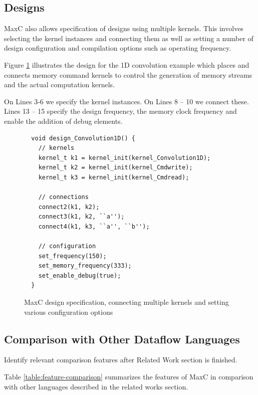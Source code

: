 \subsection{Designs}



MaxC also allows specification of designs using multiple kernels. This
involves selecting the kernel instances and connecting them as well as
setting a number of design configuration and compilation options such
as operating frequency.

Figure \ref{lst:maxc-design} illustrates the design for the 1D
convolution example which places and connects memory command kernels
to control the generation of memory streams and the actual computation
kernels.

On Lines 3-6 we specify the kernel instances. On Lines 8 -- 10 we
connect these. Lines 13 -- 15 specify the design frequency, the memory
clock frequency and enable the addition of debug elements.

\begin{figure}[!h]
\centering
\begin{lstlisting}
  void design_Convolution1D() {
    // kernels
    kernel_t k1 = kernel_init(kernel_Convolution1D);
    kernel_t k2 = kernel_init(kernel_Cmdwrite);
    kernel_t k3 = kernel_init(kernel_Cmdread);

    // connections
    connect2(k1, k2);
    connect3(k1, k2, ``a'');
    connect4(k1, k3, ``a'', ``b'');

    // configuration
    set_frequency(150);
    set_memory_frequency(333);
    set_enable_debug(true);
  }
\end{lstlisting}
\caption{MaxC design specification, connecting multiple kernels and
  setting various configuration options}
\label{lst:maxc-design}
\end{figure}

\subsection{Comparison with Other Dataflow Languages}

\TODO Identify relevant comparison features after Related Work section
is finished.

Table \ref{table:feature-comparison} summarizes the features of MaxC
in comparison with other languages described in the related works
section.

